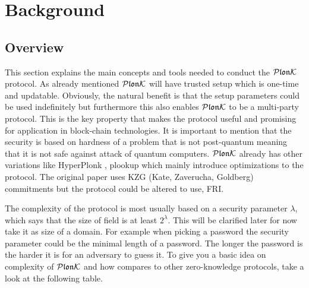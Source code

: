 \chapter{Background}
\label{Chapter2}

\section{Overview}
This section explains the main concepts and tools needed to conduct the $\mathcal{P}\mathfrak{lon}\mathcal{K}$ protocol. As already mentioned $\mathcal{P}\mathfrak{lon}\mathcal{K}$ will have trusted setup which is one-time and updatable. Obviously, the natural benefit is that the setup parameters could be used indefinitely but furthermore this also enables $\mathcal{P}\mathfrak{lon}\mathcal{K}$ to be a multi-party protocol. This is the key property that makes the protocol useful and promising for application in block-chain technologies. It is important to mention that the security is based on hardness of a problem that is not post-quantum meaning that it is not safe against attack of quantum computers. $\mathcal{P}\mathfrak{lon}\mathcal{K}$ already has other variations like HyperPlonk \cite{HyperPlonk}, plookup \cite{plookup} which mainly introduce optimizations to the protocol. The original paper uses KZG \cite{KZG} (Kate, Zaverucha, Goldberg) commitments but the protocol could be altered to use, FRI. 

The complexity of the protocol is most usually based on a security parameter $\lambda$, which says that the size of field is at least $2^{\lambda}$. This will be clarified later for now take it as size of a domain. For example when picking a password the security parameter could be the minimal length of a password. The longer the password is the harder it is for an adversary to guess it. To give you a basic idea on complexity of $\mathcal{P}\mathfrak{lon}\mathcal{K}$ and how compares to other zero-knowledge protocols, take a look at the following table.

